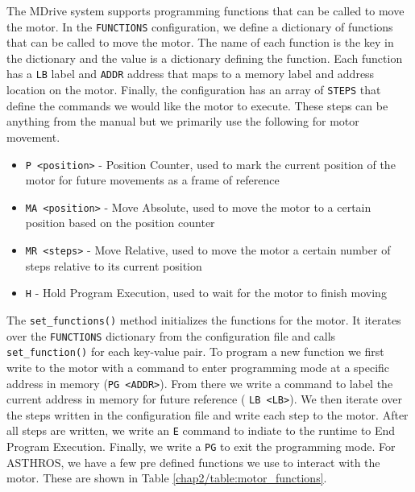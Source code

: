 The MDrive system supports programming functions that can be called to move the motor.
In the \texttt{FUNCTIONS} configuration, we define a dictionary of functions that can be called to move the motor.
The name of each function is the key in the dictionary and the value is a dictionary defining the function.
Each function has a \texttt{LB} label and \texttt{ADDR} address that maps to a memory label and address location on the motor.
Finally, the configuration has an array of \texttt{STEPS} that define the commands we would like the motor to execute.
These steps can be anything from the manual but we primarily use the following for motor movement.
\begin{itemize}
    \item \texttt{P <position>} - Position Counter, used to mark the current position of the motor for future movements as a frame of reference
    \item \texttt{MA <position>} - Move Absolute, used to move the motor to a certain position based on the position counter
    \item \texttt{MR <steps>} - Move Relative, used to move the motor a certain number of steps relative to its current position 
    \item \texttt{H} - Hold Program Execution, used to wait for the motor to finish moving 
\end{itemize}

The \texttt{set\_functions()} method initializes the functions for the motor.
It iterates over the \texttt{FUNCTIONS} dictionary from the configuration file and calls \texttt{set\_function()} for each key-value pair.
To program a new function we first write to the motor with a command to enter programming mode at a specific address in memory (\texttt{PG <ADDR>}). 
From there we write a command to label the current address in memory for future reference ( \texttt{LB <LB>}).
We then iterate over the steps written in the configuration file and write each step to the motor.
After all steps are written, we write an \texttt{E} command to indiate to the runtime to End Program Execution.
Finally, we write a \texttt{PG} to exit the programming mode. 
For ASTHROS, we have a few pre defined functions we use to interact with the motor. 
These are shown in Table \ref{chap2/table:motor_functions}.

